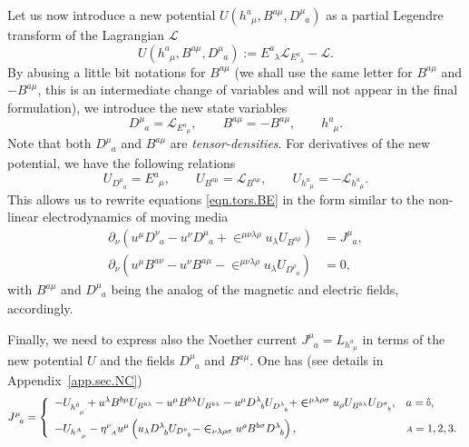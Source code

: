 \documentclass[
10pt, %
a4paper, %
oneside, %
headinclude,footinclude, %
BCOR5mm, %
]{scrartcl}
\newcommand{\sA}{\mathsmaller A}
\newcommand{\tetrsymbol}{h}
\newcommand{\itetrsymbol}{\eta}
\newcommand{\itetr}[2]{\itetrsymbol^{#1}_{\phantom{#1}#2}}
\newcommand{\tetr}[2]{\tetrsymbol^{#1}_{\phantom{#1}#2}}
\newcommand{\D}[1]{\partial_{#1}} %
\newcommand{\ET}[2]{E^{#1}_{\phantom{#1}#2}}	%
\newcommand{\Dm}[2]{D_{\phantom{#2}#1}^{#2}}	%
\newcommand{\BT}[2]{B^{#1#2}}	%
\newcommand{\Bm}[2]{B^{#1#2}}	%
\newcommand{\Laghodge}{L}%
\newcommand{\LagBE}{\mathcal{L}}%
\newcommand{\Um}{U}%
\newcommand{\LCsymb}{\bm{\in}}    %
\newcommand{\NC}[2]{J^{#2}_{\phantom{#2}#1}}
\newcommand{\indalg}[1]{\hat{\mathsmaller{#1}}}
\begin{document}
Let us now introduce a new potential $ \Um(\tetr{a}{\mu},\Bm{a}{\mu},\Dm{a}{\mu}) $ as a partial 
Legendre transform of the Lagrangian $ \LagBE $
\begin{equation}\label{eqn.Legendre1}
 \Um(\tetr{a}{\mu},\Bm{a}{\mu},\Dm{a}{\mu}) := \ET{a}{\lambda}\LagBE_{\ET{a}{\lambda}} - \LagBE.
\end{equation}
By abusing a little bit notations for $ \BT{a}{\mu} $ (we shall use the same letter for $ 
\BT{a}{\mu} $ and $ -\Bm{a}{\mu} $, this is an intermediate change 
of variables and will not appear in the final formulation), we introduce the new state variables
\begin{equation}\label{eqn.Legendre2}
\Dm{a}{\mu} = \LagBE_{\ET{a}{\mu}}, \qquad \Bm{a}{\mu} = -\BT{a}{\mu}, \qquad 
\tetr{a}{\mu}.
\end{equation}
Note 
that both $ \Dm{a}{\mu} $ and $ \Bm{a}{\mu} $ are 
\emph{tensor-densities}. For derivatives of the new potential, we have the following relations
\begin{equation}\label{eqn.Legendre3}
\Um_{\Dm{a}{\mu}} = \ET{a}{\mu}, \qquad \Um_{\Bm{a}{\mu}} = \LagBE_{\BT{a}{\mu}},
\qquad \Um_{\tetr{a}{\mu}} = - \LagBE_{\tetr{a}{\mu}}.
\end{equation}
This allows us to rewrite equations \eqref{eqn.tors.BE} in 
the form similar to the non-linear 
electrodynamics of moving media~\cite{Obukhov2008,DPRZ2017,Hohmann2018a}
\begin{subequations}
	\begin{align}
		\D{\nu}(u^\mu\Dm{a}{\nu} - u^\nu \Dm{a}{\mu} + 
		\LCsymb^{\mu\nu\lambda\rho}u_\lambda 
		\Um_{\Bm{a}{\rho}})
		& =	\NC{a}{\mu},\\[2mm]
		\D{\nu}(u^\mu \Bm{a}{\nu} - u^\nu \Bm{a}{\mu} - 
		\LCsymb^{\mu\nu\lambda\rho}u_\lambda 
		\Um_{\Dm{a}{\rho}}) 
		& = 0,
\end{align}
\end{subequations}
with $\Bm{a}{\mu}$ and $\Dm{a}{\mu}$ being the analog of the magnetic and electric fields, 
accordingly.


Finally, we need to express also the Noether current $ \NC{a}{\mu} = \Laghodge_{\tetr{a}{\mu}} $ in 
terms of the 
new potential $ \Um $ and the fields $ \Dm{a}{\mu} $ and $ \Bm{a}{\mu} $. One has (see details 
in Appendix~\ref{app.sec.NC})
\begin{equation}\label{eqn.J}
	\NC{a}{\mu} = \left\{
	\begin{array}{ll}
		-\Um_{\tetr{\indalg{0}}{\mu}}
		+ u^\lambda \Bm{b}{\mu} \Um_{\Bm{b}{\lambda}} 
		- u^\mu \Bm{b}{\lambda} \Um_{\Bm{b}{\lambda}} 
		- u^\mu \Dm{b}{\lambda} \Um_{\Dm{b}{\lambda}}
		+ \LCsymb^{\mu\lambda\rho\sigma} u_\rho \Um_{\Bm{b}{\lambda}}
		\Um_{\Dm{b}{\sigma}},	& a=\indalg{0},  \\[3mm] 
		-\Um_{\tetr{\sA}{\mu}}	
		- \itetr{\nu}{\sA}u^\mu
		\left(
		u_\lambda \Dm{b}{\lambda} \Um_{\Dm{b}{\nu}} 
		- \LCsymb_{\nu\lambda\rho\sigma}u^\rho\Bm{b}{\sigma}\Dm{b}{\lambda}
		\right), & \sA=1,2,3. \\ 
	\end{array} 
	\right.
\end{equation}
\end{document}
